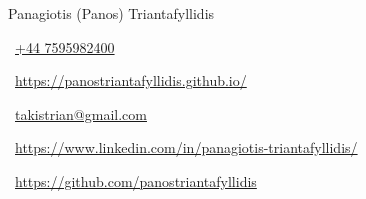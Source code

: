 \begin{huge}
    Panagiotis (Panos) Triantafyllidis
\end{huge}

\vspace{0.5em}

\begin{small}
    \begin{small}\faMobile*\end{small}~\href{tel:+447595982400}{+44 7595982400}
    \quad
    \begin{small}\faHome\end{small}~\href{https://panostriantafyllidis.github.io/}{https://panostriantafyllidis.github.io/}
    \quad
    \begin{small}\faEnvelope\end{small}~\href{mailto:takistrian@gmail.com}{takistrian@gmail.com}
    \quad
    \begin{small}\faLinkedinIn\end{small}~\href{https://www.linkedin.com/in/panagiotis-triantafyllidis/}{https://www.linkedin.com/in/panagiotis-triantafyllidis/}
    \quad
    \begin{small}\faGithub\end{small}~\href{https://github.com/panostriantafyllidis}{https://github.com/panostriantafyllidis}
\end{small}
